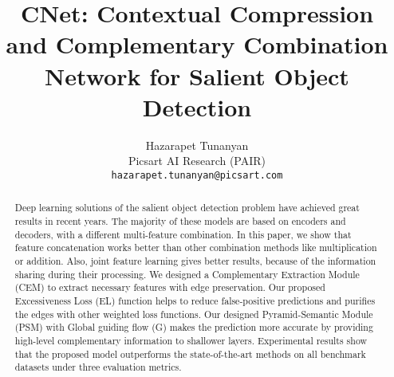 \documentclass[10pt,twocolumn,letterpaper]{article}
\begin{document}

\title{CNet: Contextual Compression and Complementary Combination \\ Network for Salient Object Detection}

\author{Hazarapet Tunanyan\\
{\small Picsart AI Research  (PAIR)}\\
{\tt\small hazarapet.tunanyan@picsart.com}
}

\maketitle
\ificcvfinal\thispagestyle{empty}\fi

\begin{abstract}
    Deep learning solutions of the salient object detection
    problem have achieved great results in recent years. The
    majority of these models are based on encoders and decoders, with a different multi-feature combination. In this
    paper, we show that feature concatenation works better
    than other combination methods like multiplication or addition. Also, joint feature learning gives better results, because of the information sharing during their processing.
    We designed a Complementary Extraction Module (CEM)
    to extract necessary features with edge preservation. Our
    proposed Excessiveness Loss (EL) function helps to reduce
    false-positive predictions and purifies the edges with other
    weighted loss functions. Our designed Pyramid-Semantic
    Module (PSM) with Global guiding flow (G) makes the prediction more accurate by providing high-level complementary information to shallower layers. Experimental results
    show that the proposed model outperforms the state-of-the-art methods on all benchmark datasets under three evaluation metrics.
\end{abstract}
\end{document}
